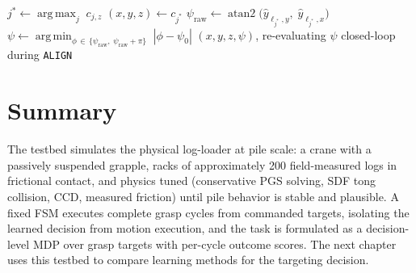 \begin{algorithm}[t]
\caption{Privileged heuristic expert (top-of-pile targeting)}
\label{alg:expert}
\begin{algorithmic}

\State $j^{*} \gets \operatorname*{arg\,max}_{j} \; c_{j,z}$
\State $(x, y, z) \gets c_{j^{*}}$
\State $\psi_{\mathrm{raw}} \gets \operatorname{atan2}\big(\hat{y}_{\ell_{j^{*}},y},\; \hat{y}_{\ell_{j^{*}},x}\big)$
\State $\psi \gets \operatorname*{arg\,min}_{\phi \,\in\, \{\psi_{\mathrm{raw}},\; \psi_{\mathrm{raw}} + \pi\}}
        \; |\phi - \psi_0|$
\State \Return $(x, y, z, \psi)$, re-evaluating $\psi$ closed-loop during \texttt{ALIGN}
\end{algorithmic}
\end{algorithm}

\section{Summary}

The testbed simulates the physical log-loader at pile scale: a crane with a
passively suspended grapple, racks of approximately 200 field-measured logs in
frictional contact, and physics tuned (conservative PGS solving, SDF tong
collision, CCD, measured friction) until pile behavior is stable and
plausible. A fixed FSM executes complete grasp cycles from commanded targets,
isolating the learned decision from motion execution, and the task is
formulated as a decision-level MDP over grasp targets with per-cycle outcome
scores. The next chapter uses this testbed to compare learning methods for
the targeting decision.

